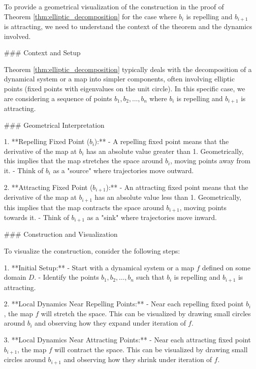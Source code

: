 To provide a geometrical visualization of the construction in the proof of Theorem \ref{thm:elliptic_decomposition} for the case where \( b_i \) is repelling and \( b_{i+1} \) is attracting, we need to understand the context of the theorem and the dynamics involved.

### Context and Setup

Theorem \ref{thm:elliptic_decomposition} typically deals with the decomposition of a dynamical system or a map into simpler components, often involving elliptic points (fixed points with eigenvalues on the unit circle). In this specific case, we are considering a sequence of points \( b_1, b_2, \ldots, b_n \) where \( b_i \) is repelling and \( b_{i+1} \) is attracting.

### Geometrical Interpretation

1. **Repelling Fixed Point (\( b_i \)):**
   - A repelling fixed point means that the derivative of the map at \( b_i \) has an absolute value greater than 1. Geometrically, this implies that the map stretches the space around \( b_i \), moving points away from it.
   - Think of \( b_i \) as a "source" where trajectories move outward.

2. **Attracting Fixed Point (\( b_{i+1} \)):**
   - An attracting fixed point means that the derivative of the map at \( b_{i+1} \) has an absolute value less than 1. Geometrically, this implies that the map contracts the space around \( b_{i+1} \), moving points towards it.
   - Think of \( b_{i+1} \) as a "sink" where trajectories move inward.

### Construction and Visualization

To visualize the construction, consider the following steps:

1. **Initial Setup:**
   - Start with a dynamical system or a map \( f \) defined on some domain \( D \).
   - Identify the points \( b_1, b_2, \ldots, b_n \) such that \( b_i \) is repelling and \( b_{i+1} \) is attracting.

2. **Local Dynamics Near Repelling Points:**
   - Near each repelling fixed point \( b_i \), the map \( f \) will stretch the space. This can be visualized by drawing small circles around \( b_i \) and observing how they expand under iteration of \( f \).

3. **Local Dynamics Near Attracting Points:**
   - Near each attracting fixed point \( b_{i+1} \), the map \( f \) will contract the space. This can be visualized by drawing small circles around \( b_{i+1} \) and observing how they shrink under iteration of \( f \).

